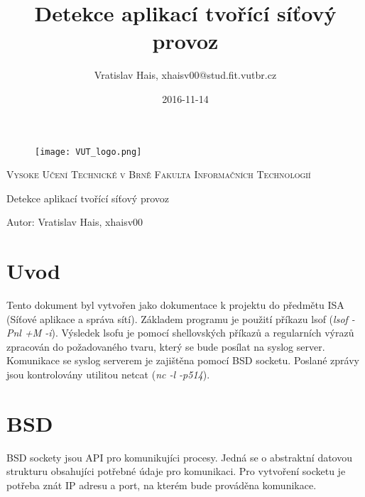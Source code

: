 \documentclass[a4paper]{article}
\title{Detekce aplikací tvořící síťový provoz}
\date{2016-11-14}
\author{Vratislav Hais, xhaisv00@stud.fit.vutbr.cz}
\begin{document}

	\begin{center}
		\begin{figure}[t!]
			\centering
			\texttt{[image: VUT\_logo.png]}
			\vspace{1in}
		\end{figure}

		\begin{center}
			\large
			\textsc{Vysoke Učení Technické v Brně}
			\textsc{Fakulta Informačních Technologií}
			\vspace{2in}
		\end{center}
		{
			\huge
			Detekce aplikací tvořící síťový provoz
		}
	\end{center}

	\vspace*{\fill}
	{
		\large
		\foreignlanguage{czech}{Autor: Vratislav Hais, xhaisv00}
	}

	\newpage

	\section{Uvod}

	Tento dokument byl vytvořen jako dokumentace k projektu do předmětu ISA (Síťové aplikace a správa sítí).
	Základem programu je použití příkazu lsof (\emph{lsof -Pnl +M -i}). Výsledek lsofu je pomocí shellovských příkazů a regularních výrazů zpracován do požadovaného tvaru, který se bude posílat na syslog server. Komunikace se syslog serverem je zajištěna pomocí BSD socketu. Poslané zprávy jsou kontrolovány utilitou netcat (\emph{nc -l -p514}).

	\section{BSD}

	BSD sockety jsou API pro komunikujíci procesy. Jedná se o abstraktní datovou strukturu obsahujíci potřebné údaje pro komunikaci. Pro vytvoření socketu je potřeba znát IP adresu a port, na kterém bude prováděna komunikace.
\end{document}
